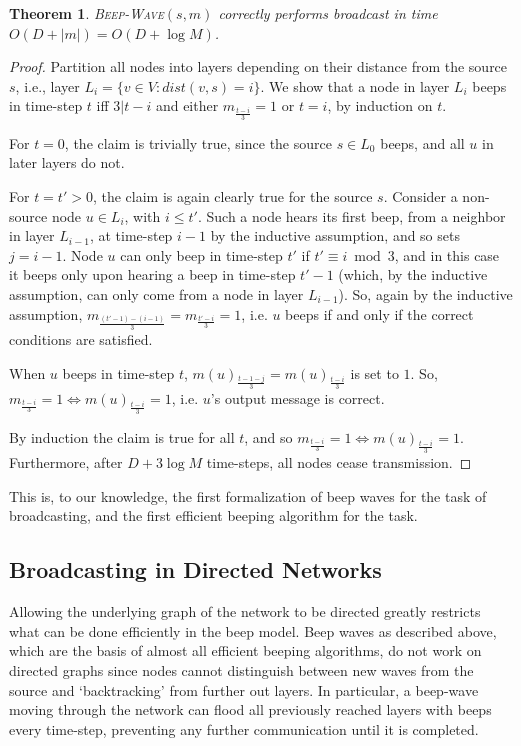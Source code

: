 \documentclass{article}
\newtheorem{theorem}{Theorem}
\begin{document}
\begin{theorem}
	\label{thm:BW1}
	\textsc{Beep-Wave}$(s,m)$ correctly performs broadcast in time $O(D+|m|) = O(D+\log M)$.
\end{theorem}

\begin{proof}
	Partition all nodes into layers depending on their distance from the source $s$, i.e., layer $L_i = \{v\in V : dist(v,s) = i\}$. We show that a node in layer $L_i$ beeps in time-step $t$ iff $3|t-i$ and either $m_\frac{t-i}{3} = 1$ or $t=i$, by induction on $t$.
	
	For $t=0$, the claim is trivially true, since the source $s\in L_0$ beeps, and all $u$ in later layers do not.
	
	For $t=t'>0$, the claim is again clearly true for the source $s$. Consider a non-source node $u\in L_i$, with $i\leq t'$. Such a node hears its first beep, from a neighbor in layer $L_{i-1}$, at time-step $i-1$ by the inductive assumption, and so sets $j=i-1$. Node $u$ can only beep in time-step $t'$ if $t' \equiv i \bmod3$, and in this case it beeps only upon hearing a beep in time-step $t' - 1$ (which, by the inductive assumption, can only come from a node in layer $L_{i-1}$). So, again by the inductive assumption, $m_\frac{(t'-1)-(i-1)}{3} = m_\frac{t'-i}{3} = 1$, i.e. $u$ beeps if and only if the correct conditions are satisfied.
	
	When $u$ beeps in time-step $t$, $m(u)_{\frac{ t-1-j}{3 }} = m(u)_{\frac{ t-i}{3 }}$ is set to $1$. So, $m_\frac{t-i}{3} = 1\iff m(u)_{\frac{ t-i}{3 }}  = 1$, i.e. $u$'s output message is correct.
	
	
	By induction the claim is true for all $t$, and so $m_\frac{t-i}{3} = 1 \iff m(u)_{\frac{ t-i}{3 }}  = 1$. Furthermore, after $D+3\log M$ time-steps, all nodes cease transmission.
	
\end{proof}

This is, to our knowledge, the first formalization of beep waves for the task of broadcasting, and the first efficient beeping algorithm for the task.

\subsection{Broadcasting in Directed Networks}

Allowing the underlying graph of the network to be directed greatly restricts what can be done efficiently in the beep model. Beep waves as described above, which are the basis of almost all efficient beeping algorithms, do not work on directed graphs since nodes cannot distinguish between new waves from the source and `backtracking' from further out layers. In particular, a beep-wave moving through the network can flood all previously reached layers with beeps every time-step, preventing any further communication until it is completed.
\end{document}
